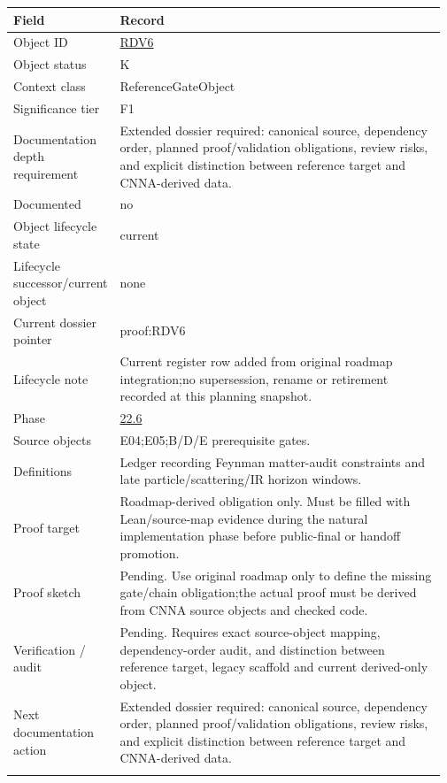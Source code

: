 \begin{longtable}{L{0.16\linewidth} L{0.81\linewidth}}
\hline
\textbf{Field} & \textbf{Record}\\
\hline
Object ID & \hyperlink{object-row-RDV6}{RDV6}\\
\hline\addlinespace[0.20em]
Object status & K\\
\hline\addlinespace[0.20em]
Context class & ReferenceGateObject\\
\hline\addlinespace[0.20em]
Significance tier & F1\\
\hline\addlinespace[0.20em]
Documentation depth requirement & Extended dossier required: canonical source, dependency order, planned proof/\allowbreak{}validation obligations, review risks, and explicit distinction between reference target and CNNA-derived data.\\
\hline\addlinespace[0.20em]
Documented & no\\
\hline\addlinespace[0.20em]
Object lifecycle state & current\\
\hline\addlinespace[0.20em]
Lifecycle successor/\allowbreak{}current object & none\\
\hline\addlinespace[0.20em]
Current dossier pointer & proof:RDV6\\
\hline\addlinespace[0.20em]
Lifecycle note & Current register row added from original roadmap integration;\newline no supersession, rename or retirement recorded at this planning snapshot.\\
\hline\addlinespace[0.20em]
Phase & \hyperlink{phase-row-22-6}{22.6}\\
\hline\addlinespace[0.20em]
Source objects & E04;\newline E05;\newline B/\allowbreak{}D/\allowbreak{}E prerequisite gates.\\
\hline\addlinespace[0.20em]
Definitions & Ledger recording Feynman matter-audit constraints and late particle/\allowbreak{}scattering/\allowbreak{}IR horizon windows.\\
\hline\addlinespace[0.20em]
Proof target & Roadmap-derived obligation only. Must be filled with Lean/\allowbreak{}source-map evidence during the natural implementation phase before public-final or handoff promotion.\\
\hline\addlinespace[0.20em]
Proof sketch & Pending. Use original roadmap only to define the missing gate/\allowbreak{}chain obligation;\newline the actual proof must be derived from CNNA source objects and checked code.\\
\hline\addlinespace[0.20em]
Verification /\allowbreak{} audit & Pending. Requires exact source-object mapping, dependency-order audit, and distinction between reference target, legacy scaffold and current derived-only object.\\
\hline\addlinespace[0.20em]
Next documentation action & Extended dossier required: canonical source, dependency order, planned proof/\allowbreak{}validation obligations, review risks, and explicit distinction between reference target and CNNA-derived data.\\
\hline\addlinespace[0.20em]
\end{longtable}
